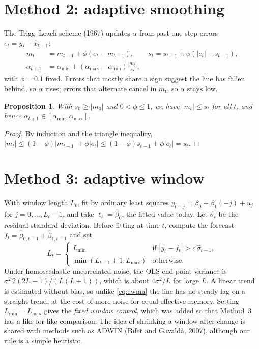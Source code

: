 \documentclass[12pt,a4paper]{report}
\newtheorem{proposition}{Proposition}[chapter]
\theoremstyle{definition}\newtheorem{definition}{Definition}[chapter]
\begin{document}
\section{Method 2: adaptive smoothing}
The Trigg--Leach scheme (1967) updates $\alpha$ from past one-step errors $e_t=y_t-\hat x_{t-1}$:
\begin{align}
m_t&=m_{t-1}+\phi(e_t-m_{t-1}),\qquad s_t=s_{t-1}+\phi(|e_t|-s_{t-1}),\\
\alpha_{t+1}&=\alpha_{\min}+(\alpha_{\max}-\alpha_{\min})\frac{|m_t|}{s_t},
\end{align}
with $\phi=0.1$ fixed. Errors that mostly share a sign suggest the line has fallen behind, so $\alpha$ rises; errors that alternate cancel in $m_t$, so $\alpha$ stays low.
\begin{proposition}\label{prop:bound}
With $s_0\ge|m_0|$ and $0<\phi\le1$, we have $|m_t|\le s_t$ for all $t$, and hence $\alpha_{t+1}\in[\alpha_{\min},\alpha_{\max}]$.
\end{proposition}
\begin{proof}
By induction and the triangle inequality, $|m_t|\le(1-\phi)|m_{t-1}|+\phi|e_t|\le(1-\phi)s_{t-1}+\phi|e_t|=s_t$.
\end{proof}

\section{Method 3: adaptive window}
With window length $L_t$, fit by ordinary least squares $y_{t-j}=\beta_0+\beta_1(-j)+u_j$ for $j=0,\dots,L_t-1$, and take $\ell_t=\hat\beta_0$, the fitted value today. Let $\hat\sigma_t$ be the residual standard deviation. Before fitting at time $t$, compute the forecast $f_t=\hat\beta_{0,t-1}+\hat\beta_{1,t-1}$ and set
\begin{equation}
L_t=\begin{cases}L_{\min}&\text{if }|y_t-f_t|>c\,\hat\sigma_{t-1},\\ \min(L_{t-1}+1,L_{\max})&\text{otherwise.}\end{cases}
\end{equation}
Under homoscedastic uncorrelated noise, the OLS end-point variance is $\sigma^2\,2(2L-1)/(L(L+1))$, which is about $4\sigma^2/L$ for large $L$. A linear trend is estimated without bias, so unlike \eqref{eq:ewma} the line has no steady lag on a straight trend, at the cost of more noise for equal effective memory. Setting $L_{\min}=L_{\max}$ gives the \emph{fixed window control}, which was added so that Method~3 has a like-for-like comparison. The idea of shrinking a window after change is shared with methods such as ADWIN (Bifet and Gavald\`a, 2007), although our rule is a simple heuristic.
\end{document}
